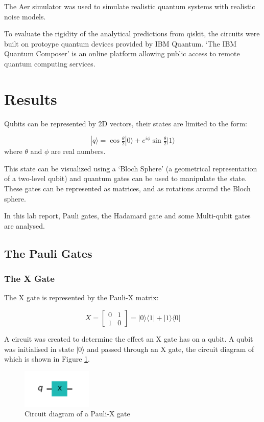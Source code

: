 The Aer simulator was used to simulate realistic quantum systems with realistic noise models.

To evaluate the rigidity of the analytical predictions from qiskit, the circuits were built on protoype quantum devices provided by IBM Quantum. `The IBM Quantum Composer' is an online platform allowing public access to remote quantum computing services.

\section{Results}
Qubits can be represented by 2D vectors, their states are limited to the form:

$$ |q\rangle = \cos{\tfrac{\theta}{2}}|0\rangle + e^{i\phi}\sin{\tfrac{\theta}{2}}|1\rangle $$
where $\theta$ and $\phi$ are real numbers. 

This state can be visualized using a `Bloch Sphere' (a geometrical representation of a two-level qubit) and quantum gates can be used to manipulate the state. These gates can be represented as matrices, and as rotations around the Bloch sphere.

In this lab report, Pauli gates, the Hadamard gate and some Multi-qubit gates are analysed.

\subsection{The Pauli Gates}

\subsubsection{The X Gate}
The X gate is represented by the Pauli-X matrix:

$$ X = \begin{bmatrix} 0 & 1 \\ 1 & 0 \end{bmatrix} = |0\rangle\langle1| + |1\rangle\langle0| $$

A circuit was created to determine the effect an X gate has on a qubit. A qubit was initialised in state $|0\rangle$ and passed through an X gate, the circuit diagram of which is shown in Figure \ref{fig:xGate}.

\begin{figure}[h]
    \centering
    \includegraphics[width=0.3\textwidth]{lab2/images/xGate.png}
    \caption{Circuit diagram of a Pauli-X gate} 
    \label{fig:xGate}
\end{figure}


